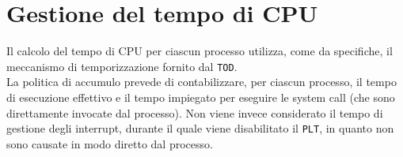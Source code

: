 \documentclass[11pt]{article}
\begin{document}
\section{Gestione del tempo di CPU}
Il calcolo del tempo di CPU per ciascun processo utilizza, come da specifiche, il meccanismo di temporizzazione fornito dal \texttt{TOD}.\\
La politica di accumulo prevede di contabilizzare, per ciascun processo, il tempo di esecuzione effettivo e il tempo impiegato per eseguire le system call (che sono direttamente invocate dal processo).
Non viene invece considerato il tempo di gestione degli interrupt, durante il quale viene disabilitato il \texttt{PLT}, in quanto non sono causate in modo diretto dal processo.

\newpage
\end{document}
